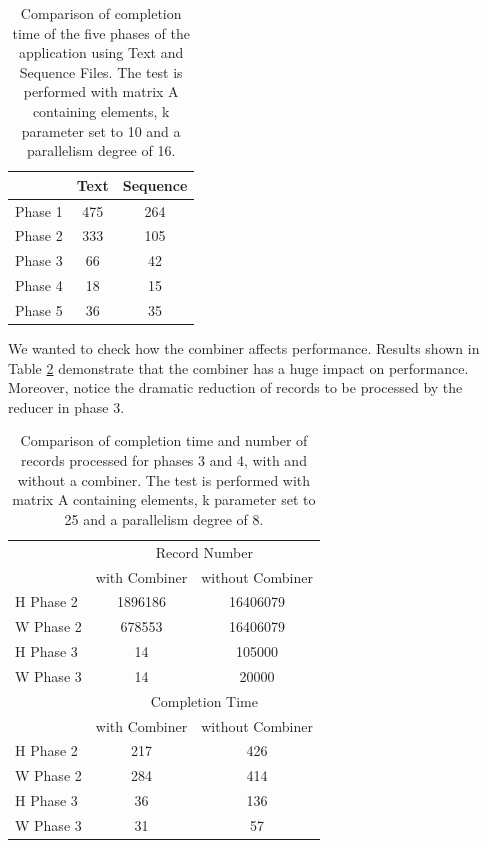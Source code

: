 \begin{table}
\begin{center}
\begin{tabular}{ | l || c | c | }
  \hline      
  & Text & Sequence \\
  \hline      
  Phase 1 & 475 & 264 \\
  Phase 2 & 333 & 105 \\
  Phase 3 & 66 & 42 \\ 
  Phase 4 & 18 & 15 \\
  Phase 5 & 36 & 35 \\
  \hline  
\end{tabular}
\end{center}
\caption{Comparison of completion time of the five phases of the application using Text and Sequence Files.
The test is performed with matrix A containing  elements, k parameter set to 10 and a parallelism degree of 16. }
\label{tab:textvsSeq}
\end{table}

We  wanted to check how the combiner affects performance.
Results shown in Table \ref{comb_table} demonstrate that the combiner has a huge impact on performance.
Moreover, notice the dramatic reduction of records to be processed by the reducer in phase 3.

\begin{table}[h!]
\begin{center}

\begin{tabular}{ | l || c | c | }
  \hline      
  & \multicolumn{2}{|c|}{Record Number} \\
  & with Combiner & without Combiner \\
  \hline      
  H Phase 2 & 1896186 & 16406079 \\
  W Phase 2 & 678553 & 16406079 \\ 
  H Phase 3 & 14 & 105000 \\ 
  W Phase 3 & 14 & 20000 \\ 
 \hline  
  \hline      
  & \multicolumn{2}{|c|}{Completion Time} \\
  & with Combiner & without Combiner \\
  \hline      
  H Phase 2 & 217 & 426 \\
  W Phase 2 & 284 & 414 \\ 
  H Phase 3 & 36 & 136 \\ 
  W Phase 3 & 31 & 57 \\ 
 \hline  
\end{tabular}

\end{center}
\caption{Comparison of completion time and number of records processed for phases 3 and 4, with and without a combiner.
The test is performed with matrix A containing  elements, k parameter set to 25 and a parallelism degree of 8.}
\label{comb_table}
\end{table}














